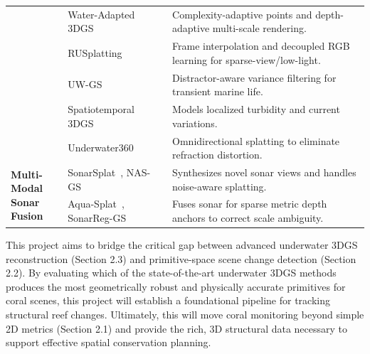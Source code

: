 \begin{table}[htbp]
{\begin{tabular}{@{} l l p{8.5cm} @{}}
    & Water-Adapted 3DGS~\cite{10.3389/fmars.2025.1573612} & Complexity-adaptive points and depth-adaptive multi-scale rendering. \\
    & RUSplatting~\cite{jiang2025rusplattingrobust3dgaussian} & Frame interpolation and decoupled RGB learning for sparse-view/low-light. \\
    & UW-GS~\cite{10943785} & Distractor-aware variance filtering for transient marine life. \\
    & Spatiotemporal 3DGS~\cite{Liu_2025} & Models localized turbidity and current variations. \\
    & Underwater360~\cite{hu2026underwater360reconstructingunderwaterscenes} & Omnidirectional splatting to eliminate refraction distortion. \\ \midrule
    \multirow{2}{*}{\parbox{3.5cm}{\textbf{Multi-Modal\\ Sonar Fusion}}} 
    & SonarSplat~\cite{11223217}, NAS-GS~\cite{xu2026nasgsnoiseawaresonargaussian} & Synthesizes novel sonar views and handles noise-aware splatting.\\
    & Aqua-Splat~\cite{11184160}, SonarReg-GS~\cite{s26154713} & Fuses sonar for sparse metric depth anchors to correct scale ambiguity. \\ \bottomrule
    \end{tabular}
    }
\end{table}

This project aims to bridge the critical gap between advanced underwater 3DGS reconstruction (Section 2.3) and primitive-space scene change detection (Section 2.2). By evaluating which of the state-of-the-art underwater 3DGS methods produces the most geometrically robust and physically accurate primitives for coral scenes, this project will establish a foundational pipeline for tracking structural reef changes. Ultimately, this will move coral monitoring beyond simple 2D metrics (Section 2.1) and provide the rich, 3D structural data necessary to support effective spatial conservation planning.
